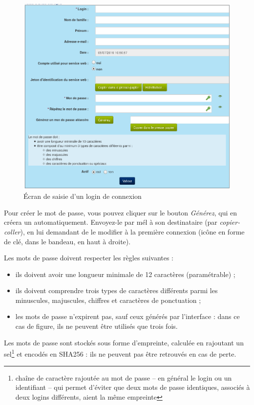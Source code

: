 \begin{figure}[H]
\includegraphics[width=\linewidth]{dessin/creation-login}
\caption{Écran de saisie d'un login de connexion}
\end{figure}

Pour créer le mot de passe, vous pouvez cliquer sur le bouton \textit{Générez}, qui  en créera un automatiquement. Envoyez-le par mél à son destinataire (par \textit{copier-coller}), en lui demandant de le modifier à la première connexion (icône en forme de clé, dans le bandeau, en haut à droite).

Les mots de passe doivent respecter les règles suivantes :
\begin{itemize}
\item ils doivent avoir une longueur minimale de 12 caractères (paramétrable) ;
\item ils doivent comprendre trois types de caractères différents parmi les minuscules, majuscules, chiffres et caractères de ponctuation ;
\item les mots de passe n'expirent pas, sauf ceux générés par l'interface : dans ce cas de figure, ils ne peuvent être utilisés que trois fois.
\end{itemize}

Les mots de passe sont stockés sous forme d'empreinte, calculée en rajoutant un sel\footnote{chaîne de caractère rajoutée au mot de passe -- en général le login ou un identifiant -- qui permet d'éviter que deux mots de passe identiques, associés à deux logins différents, aient la même empreinte} et encodés en SHA256 : ils ne peuvent pas être retrouvés en cas de perte.

